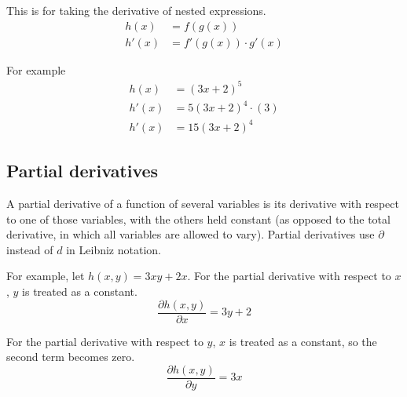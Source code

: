 This is for taking the derivative of nested expressions.
\begin{align*}
  h(x) &= f(g(x)) \\
  h'(x) &= f'(g(x)) \cdot g'(x)
\end{align*}

For example
\begin{align*}
  h(x) &= \left(3x + 2\right)^5 \\
  h'(x) &= 5\left(3x + 2\right)^4 \cdot \left(3\right) \\
  h'(x) &= 15\left(3x + 2\right)^4
\end{align*}

\subsection{Partial derivatives}
\label{subsec:partial_derivatives}

A partial derivative of a function of several variables is its derivative with
respect to one of those variables, with the others held constant (as opposed to
the total derivative, in which all variables are allowed to vary). Partial
derivatives use $\partial$ instead of $d$ in Leibniz notation.

For example, let $h(x, y) = 3xy + 2x$. For the partial derivative with respect
to $x$, $y$ is treated as a constant.
\begin{equation*}
  \frac{\partial h(x, y)}{\partial x} = 3y + 2
\end{equation*}

For the partial derivative with respect to $y$, $x$ is treated as a constant, so
the second term becomes zero.
\begin{equation*}
  \frac{\partial h(x, y)}{\partial y} = 3x
\end{equation*}
